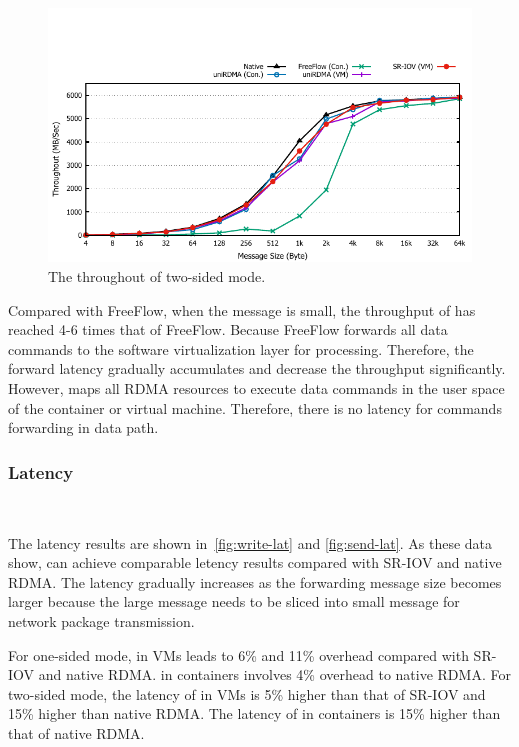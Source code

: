 \begin{figure}[!ht]
	\centering
	\includegraphics[width=1.0\linewidth]{images/send-bw.pdf}
	\caption{The throughout of two-sided mode.}
	\label{fig:send-bw}
\end{figure}

Compared with FreeFlow, when the message is small, the throughput of \sys has reached 4-6 times that of FreeFlow. Because FreeFlow forwards all data commands to the software virtualization layer for processing. Therefore, the forward latency gradually accumulates and decrease the throughput significantly. However, \sys maps all RDMA resources to execute data commands in the user space of the container or virtual machine. Therefore, there is no latency for commands forwarding in data path.





\subsubsection{\textbf{Latency}}
\
\noindent

The latency results are shown in~\ref{fig:write-lat} and \ref{fig:send-lat}. As these data show, \sys can achieve comparable letency results compared with SR-IOV and native RDMA. The latency gradually increases as the forwarding message size becomes larger because the large message needs to be sliced into small message for network package transmission.

For one-sided mode, \sys in VMs leads to 6\% and 11\% overhead compared with SR-IOV and native RDMA. \sys in containers involves 4\% overhead to native RDMA. For two-sided mode, the latency of \sys in VMs is 5\% higher than that of SR-IOV and 15\% higher than native RDMA. The latency of \sys in containers is 15\% higher than that of native RDMA.

